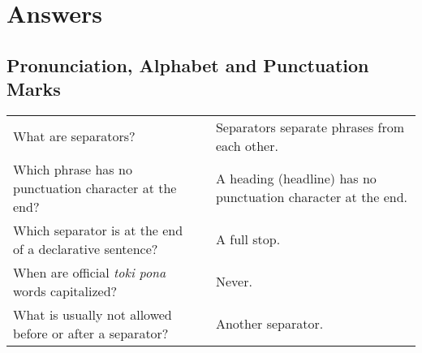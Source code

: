 \section{Answers}

\subsection*{Pronunciation, Alphabet and Punctuation Marks} 
\label{'pronunciation_alphabet'}
%
\begin{supertabular}{p{5,5cm}|ll}
What are separators? && Separators separate phrases from each other.  \\ %
Which phrase has no punctuation character at the end? && A heading (headline) has no punctuation character at the end. \\ %
Which separator is at the end of a declarative sentence? && A full stop. \\ %
When are official \textit{toki pona} words capitalized? && Never. \\ %
What is usually not allowed before or after a separator? && Another separator. \\ %
\end{supertabular} 

